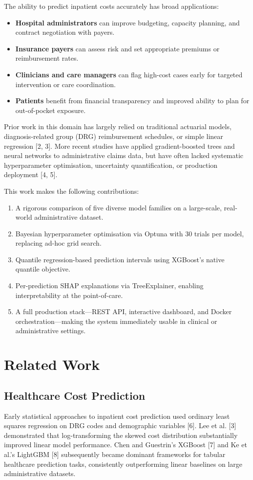 \documentclass[11pt,a4paper]{article}
\begin{document}
The ability to predict inpatient costs accurately has broad applications:
\begin{itemize}
  \item \textbf{Hospital administrators} can improve budgeting, capacity planning, and contract negotiation with payers.
  \item \textbf{Insurance payers} can assess risk and set appropriate premiums or reimbursement rates.
  \item \textbf{Clinicians and care managers} can flag high-cost cases early for targeted intervention or care coordination.
  \item \textbf{Patients} benefit from financial transparency and improved ability to plan for out-of-pocket exposure.
\end{itemize}

Prior work in this domain has largely relied on traditional actuarial models, diagnosis-related group (DRG) reimbursement schedules, or simple linear regression [2, 3]. More recent studies have applied gradient-boosted trees and neural networks to administrative claims data, but have often lacked systematic hyperparameter optimisation, uncertainty quantification, or production deployment [4, 5].

This work makes the following contributions:
\begin{enumerate}
  \item A rigorous comparison of five diverse model families on a large-scale, real-world administrative dataset.
  \item Bayesian hyperparameter optimisation via Optuna with 30 trials per model, replacing ad-hoc grid search.
  \item Quantile regression-based prediction intervals using XGBoost's native quantile objective.
  \item Per-prediction SHAP explanations via TreeExplainer, enabling interpretability at the point-of-care.
  \item A full production stack---REST API, interactive dashboard, and Docker orchestration---making the system immediately usable in clinical or administrative settings.
\end{enumerate}

\section{Related Work}
\subsection{Healthcare Cost Prediction}
Early statistical approaches to inpatient cost prediction used ordinary least squares regression on DRG codes and demographic variables [6]. Lee et al. [3] demonstrated that log-transforming the skewed cost distribution substantially improved linear model performance. Chen and Guestrin's XGBoost [7] and Ke et al.'s LightGBM [8] subsequently became dominant frameworks for tabular healthcare prediction tasks, consistently outperforming linear baselines on large administrative datasets.
\end{document}
